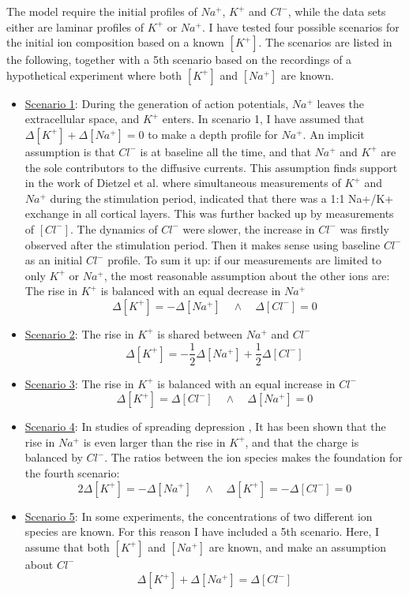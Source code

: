 \documentclass{article}
\begin{document}
The model require the initial profiles of $Na^+$, $K^+$ and $Cl^-$, while the data sets either are laminar profiles of $K^+$ or $Na^+$. I have tested four possible scenarios for the initial ion composition based on a known $[K^+]$. The scenarios are listed in the following, together with a 5th scenario based on the recordings of a hypothetical experiment where  both $[K^+]$ and $[Na^+]$ are known.

\begin{itemize}\label{Scenarios}
	\item[]\underline{Scenario 1}: During the generation of action potentials, $Na^+$ leaves the extracellular space, and $K^+$ enters. In scenario 1, I have assumed that $\Delta [K^+] + \Delta [Na^+] = 0$ to make a depth profile for $Na^+$. An implicit assumption is that $Cl^-$ is at baseline all the time, and that $Na^+$ and $K^+$ are the sole contributors to the diffusive currents. This assumption finds support in the work of Dietzel et al. \cite{Dietzel1982} where simultaneous measurements of $K^+$ and $ Na^+$ during the stimulation period, indicated that there was a 1:1 Na+/K+ exchange in all cortical layers. This was further backed up by measurements of $[Cl^-]$. The dynamics of $Cl^-$ were slower, the increase in $Cl^-$ was firstly observed after the stimulation period. Then it makes sense using baseline $Cl^-$ as an initial $Cl^-$ profile. 
To sum it up: if our measurements are limited to only $K^+$ or $Na^+$, the most reasonable assumption about the other ions are:
	The rise in $K^+$ is balanced with an equal decrease in $Na^+$
	  $$\Delta [K^+] = -\Delta [Na^+] \quad \land \quad \Delta [Cl^-] =0$$
	\item[]\underline{Scenario 2}:  The rise in $K^+$ is shared between $Na^+$ and $Cl^-$
	$$\Delta [K^+] = -\frac{1}{2} \Delta [Na^+] +\frac{1}{2} \Delta [Cl^-] $$ 
		\item[]\underline{Scenario 3}:  The rise in $K^+$ is balanced with an equal increase in $Cl^-$
	  $$\Delta [K^+] = \Delta [Cl^-] \quad \land \quad \Delta [Na^+] =0$$
	  \item[]\underline{Scenario 4}:  In studies of spreading depression \cite{Ataya2015}\cite{Herreras1993}, It has been shown that the rise in $Na^+$ is even larger than the rise in $K^+$, and that the charge is balanced by $Cl^-$. The ratios between the ion species makes the foundation for the fourth scenario:
	$$2\Delta [K^+] = - \Delta [Na^+] \quad \land \quad \Delta [K^+] =  -\Delta [Cl^-] =0$$ 
	\item[]\underline{Scenario 5}: In some experiments, the concentrations of two different ion species are known. For this reason I have included a 5th scenario. Here, I assume that both $[K^+]$ and $[Na^+]$ are known, and make an assumption about $Cl^-$
	$$\Delta [K^+] + \Delta [Na^+] = \Delta[Cl^-] $$
\end{itemize}
\end{document}
